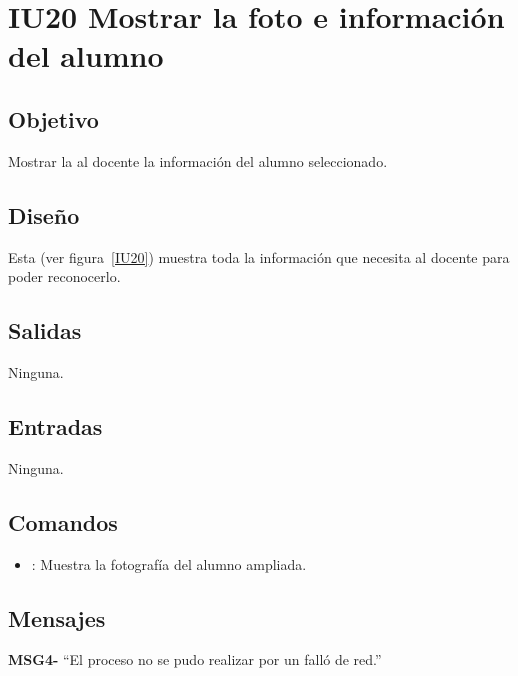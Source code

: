 \section{IU20 Mostrar la foto e información  del alumno}

\subsection{Objetivo}
    Mostrar la al docente la información del alumno seleccionado.

\subsection{Diseño}
    Esta  (ver figura~\ref{IU20}) muestra toda la información que necesita al docente para poder reconocerlo.


\subsection{Salidas}

    Ninguna.

\subsection{Entradas}
    Ninguna.

\subsection{Comandos}
\begin{itemize}
    \item {}: Muestra la fotografía del alumno ampliada. 
    
\end{itemize}

\subsection{Mensajes}

\begin{Citemize}
    \item {\bf MSG4-} ``El proceso no se pudo realizar por un falló de red.''
\end{Citemize}

